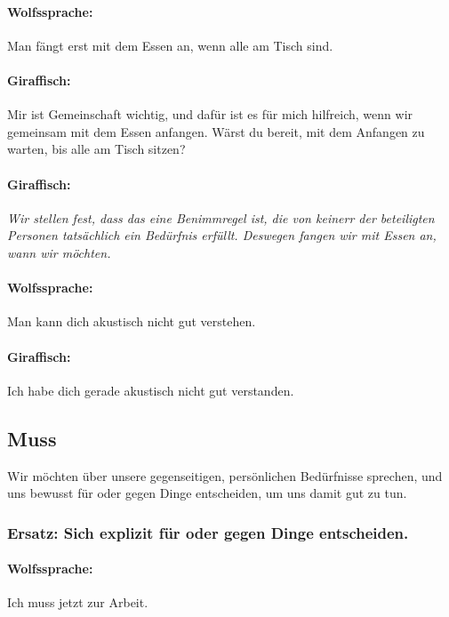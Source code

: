 \paragraph{Wolfssprache:} Man fängt erst mit dem Essen an, wenn alle am Tisch sind.

\paragraph{Giraffisch:} Mir ist Gemeinschaft wichtig, und dafür ist es für mich hilfreich, wenn wir gemeinsam mit dem Essen anfangen. Wärst du bereit, mit dem Anfangen zu warten, bis alle am Tisch sitzen?

\paragraph{Giraffisch:} \emph{Wir stellen fest, dass das eine Benimmregel ist, die von keinerr der beteiligten Personen tatsächlich ein Bedürfnis erfüllt. Deswegen fangen wir mit Essen an, wann wir möchten.}

\paragraph{Wolfssprache:} Man kann dich akustisch nicht gut verstehen.

\paragraph{Giraffisch:} Ich habe dich gerade akustisch nicht gut verstanden.


\subsection{Muss}

Wir möchten über unsere gegenseitigen, persönlichen Bedürfnisse sprechen, und uns bewusst für oder gegen Dinge entscheiden, um uns damit gut zu tun.

\subsubsection{Ersatz: Sich explizit für oder gegen Dinge entscheiden.}

\paragraph{Wolfssprache:} Ich muss jetzt zur Arbeit.

